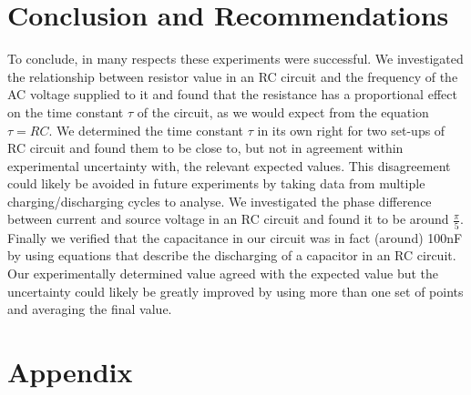 \documentclass[12pt]{article}
\numberwithin{equation}{section}
\numberwithin{figure}{section}
\begin{document}
    \section{Conclusion and Recommendations}
    To conclude, in many respects these experiments were successful. We investigated the relationship 
    between resistor value in an RC circuit and the frequency of the AC voltage supplied to it and found 
    that the resistance has a proportional effect on the time constant $\tau$ of the circuit, as we would 
    expect from the equation $\tau=RC$. \newline
    We determined the time constant $\tau$ in its own right for two set-ups of RC circuit and found them 
    to be close to, but not in agreement within experimental uncertainty with, the relevant expected values.
    This disagreement could likely be avoided in future experiments by taking data from multiple charging/discharging 
    cycles to analyse. \newline
    We investigated the phase difference between current and source voltage in an RC circuit and found it 
    to be around $\frac{\pi}{5}$. \newline
    Finally we verified that the capacitance in our circuit was in fact (around) 100nF by using equations 
    that describe the discharging of a capacitor in an RC circuit. Our experimentally determined value 
    agreed with the expected value but the uncertainty could likely be greatly improved by using more than 
    one set of points and averaging the final value.

    \newpage
    \section{Appendix}
    \setcounter{figure}{0} \renewcommand{\thefigure}{A.\arabic{figure}}
    
    
    
    
\end{document}
